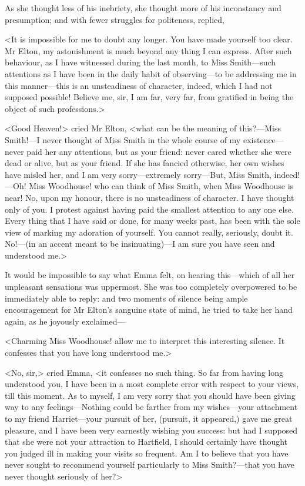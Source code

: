 As she thought less of his inebriety, she thought more of his inconstancy and presumption; and with fewer struggles for politeness, replied,

<It is impossible for me to doubt any longer. You have made yourself too clear. Mr Elton, my astonishment is much beyond any thing I can express. After such behaviour, as I have witnessed during the last month, to Miss Smith—such attentions as I have been in the daily habit of observing—to be addressing me in this manner—this is an unsteadiness of character, indeed, which I had not supposed possible! Believe me, sir, I am far, very far, from gratified in being the object of such professions.>

<Good Heaven!> cried Mr Elton, <what can be the meaning of this?—Miss Smith!—I never thought of Miss Smith in the whole course of my existence—never paid her any attentions, but as your friend: never cared whether she were dead or alive, but as your friend. If she has fancied otherwise, her own wishes have misled her, and I am very sorry—extremely sorry—But, Miss Smith, indeed!—Oh! Miss Woodhouse! who can think of Miss Smith, when Miss Woodhouse is near! No, upon my honour, there is no unsteadiness of character. I have thought only of you. I protest against having paid the smallest attention to any one else. Every thing that I have said or done, for many weeks past, has been with the sole view of marking my adoration of yourself. You cannot really, seriously, doubt it. No!—(in an accent meant to be insinuating)—I am sure you have seen and understood me.>

It would be impossible to say what Emma felt, on hearing this—which of all her unpleasant sensations was uppermost. She was too completely overpowered to be immediately able to reply: and two moments of silence being ample encouragement for Mr Elton's sanguine state of mind, he tried to take her hand again, as he joyously exclaimed—

<Charming Miss Woodhouse! allow me to interpret this interesting silence. It confesses that you have long understood me.>

<No, sir,> cried Emma, <it confesses no such thing. So far from having long understood you, I have been in a most complete error with respect to your views, till this moment. As to myself, I am very sorry that you should have been giving way to any feelings—Nothing could be farther from my wishes—your attachment to my friend Harriet—your pursuit of her, (pursuit, it appeared,) gave me great pleasure, and I have been very earnestly wishing you success: but had I supposed that she were not your attraction to Hartfield, I should certainly have thought you judged ill in making your visits so frequent. Am I to believe that you have never sought to recommend yourself particularly to Miss Smith?—that you have never thought seriously of her?>

